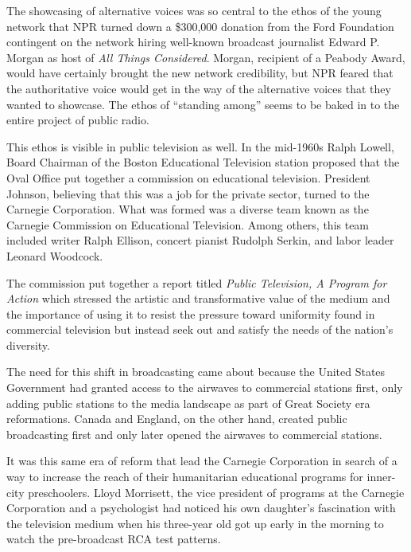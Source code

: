 \documentclass[12pt,letterpaper]{article}
\begin{document}
	The showcasing of alternative voices was so central to the ethos of the
	young network that NPR turned down a \$300,000 donation from 
	the Ford 
	Foundation contingent on the network hiring well-known broadcast
	journalist Edward P. Morgan as host of \textit{All Things Considered}. 
	Morgan, recipient of a Peabody Award, would have certainly 
	brought the new network
	credibility, but NPR feared that the authoritative voice would
	get in the way of the alternative voices that they wanted to showcase.
	The ethos of ``standing among'' seems to be baked in to the entire
	project of public radio.

	This ethos is visible in public television as well. In the mid-1960s
	Ralph Lowell, Board Chairman of the Boston Educational Television 
	station proposed that the Oval Office put together a commission on 
	educational television. President Johnson, believing that this was
	a job for the private sector, turned to the Carnegie Corporation.
	What was formed was a diverse team known as the Carnegie Commission
	on Educational Television. Among others, this team included writer Ralph
	Ellison, concert pianist Rudolph Serkin, and labor leader Leonard 
	Woodcock.\autocite[409]{Meany}

	The commission put together a report titled \textit{Public Television, A 
	Program for Action} which stressed the artistic and transformative value
	of the medium and the importance of using it to resist the pressure 
	toward uniformity found in commercial television but instead seek out 
	and satisfy the needs of the nation's diversity.\autocite[410]{Meany}

	The need for this shift in broadcasting came about because the
	United States Government had granted access to the airwaves to 
	commercial stations
	first, only adding public stations to the media landscape as part of
	Great Society era reformations. Canada and England, on the other
	hand, created public broadcasting first and only later opened the
	airwaves to commercial stations.\autocite[412]{Meany}

	It was this same era of reform that lead the Carnegie Corporation
	in search of a way to increase the reach of their 
	humanitarian educational programs for inner-city preschoolers.
	\autocite[15]{Davis} Lloyd Morrisett, the vice president of programs at
	the Carnegie Corporation\autocite[7]{Cooney} and a psychologist
	\autocite[15]{Davis} had noticed his own daughter's fascination with
	the television medium when his three-year old got up early in the 
	morning to watch the pre-broadcast RCA test patterns.
	\autocite[11]{Davis}
	
\end{document}
